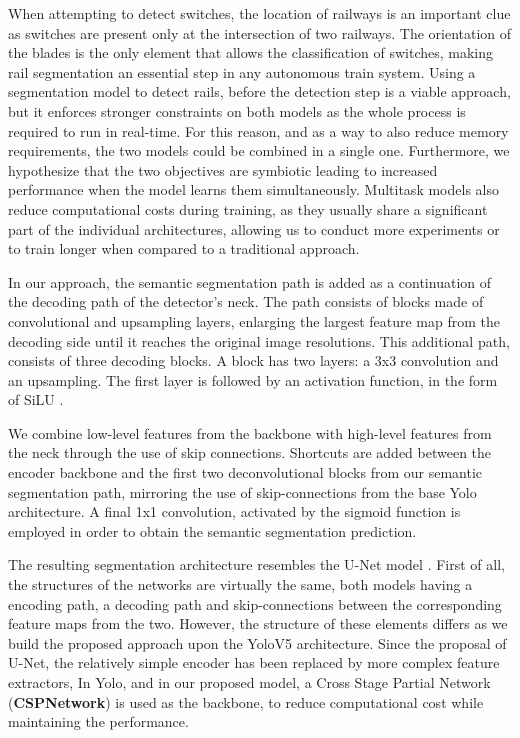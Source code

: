 \documentclass[conference]{IEEEtran}
\begin{document}
When attempting to detect switches, the location of railways is an important clue as switches are present only at the intersection of two railways. The orientation of the blades is the only element that allows the classification of switches, making rail segmentation an essential step in any autonomous train system. Using a segmentation model to detect rails, before the detection step is a viable approach, but it enforces stronger constraints on both models as the whole process is required to run in  real-time. For this reason, and as a way to also reduce memory requirements, the two models could be combined in a single one. Furthermore, we hypothesize that the two objectives are symbiotic leading to increased performance when the model learns them simultaneously. Multitask models also reduce computational costs during training, as they usually share a significant part of the individual architectures, allowing us to conduct more experiments or to train longer when compared to a traditional approach.

In our approach, the semantic segmentation path is added as a continuation of the decoding path of the detector's neck. The path consists of blocks made of convolutional and upsampling layers, enlarging the largest feature map from the decoding side until it reaches the original image resolutions. This additional path, consists of three decoding blocks. A block has two layers: a 3x3 convolution and an upsampling. The first layer is followed by an activation function, in the form of SiLU \cite{elfwing2018sigmoid}.

We combine low-level features from the backbone with high-level features from the neck through the use of skip connections. 
Shortcuts are added between the encoder backbone and the first two deconvolutional blocks from our semantic segmentation path, mirroring the use of skip-connections from the base Yolo architecture. A final 1x1 convolution, activated by the sigmoid function is employed in order to obtain the semantic segmentation prediction.

The resulting segmentation architecture resembles the U-Net model \cite{ronneberger2015u}. First of all, the structures of the networks are virtually the same, both models having a encoding path, a decoding path and skip-connections between the corresponding feature maps from the two. However, the structure of these elements differs as we build the proposed approach upon the YoloV5 architecture. Since the proposal of U-Net, the relatively simple encoder has been replaced by more complex feature extractors, In Yolo, and in our proposed model, a Cross Stage Partial Network (\textbf{CSPNetwork}) \cite{wang2020cspnet} is used as the backbone, to reduce computational cost while maintaining the performance.
\end{document}
